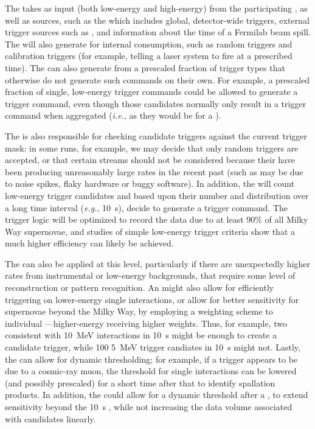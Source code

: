 The  takes as input  (both low-energy
and high-energy) from the participating , as well as
 sources, such as the  which includes
global, detector-wide triggers, external trigger sources such as
, and information about the time of a Fermilab beam
spill. 
The  will also generate  for internal
consumption, such as random triggers and calibration triggers (for
example, telling a laser system to fire at a prescribed time). 
The  can also generate  from a
prescaled fraction of trigger types that otherwise do not generate
such commands on their own. 
For example, a prescaled fraction of single, low-energy trigger
commands could be allowed to generate a trigger command, even though
those candidates normally only result in a trigger command when
aggregated ({\it i.e.}, as they would be for a ).


The  is also responsible for checking candidate triggers
against the current  trigger mask: in some runs, for
example, we may decide that only random triggers are accepted, or that
certain  streams should not be considered
because their  have been producing unreasonably large
rates in the recent past (such as may be due to noise spikes, flaky
hardware or buggy software).
In addition, the  will count low-energy trigger candidates
and based upon their number and distribution over a long time interval
({\it e.g.}, \SI{10}{\s}), decide to generate a  trigger command.
The trigger logic will be optimized to record the data due to at least
90\% of all Milky Way supernovae, and studies of simple low-energy
trigger criteria show that a much higher efficiency can likely be
achieved.

	
The  can also be applied at this level, particularly if
there are unexpectedly higher rates from instrumental or low-energy
backgrounds, that require some level of reconstruction or pattern
recognition. 
An  might also allow for efficiently triggering on
lower-energy single interactions, or allow for better sensitivity for
supernovae beyond the Milky Way, by employing a weighting scheme to
individual ---higher-energy
 receiving higher weights. 
Thus, for example, two  consistent with
\SI{10}{\MeV} interactions in \SI{10}{\s} might be enough to create a
 candidate trigger, while 100 \SI{5}{\MeV} trigger
candiates in \SI{10}{\s} might not.
Lastly, the  can allow for dynamic thresholding; for
example, if a trigger appears to be due to a cosmic-ray muon, the
threshold for single interactions can be lowered (and possibly
prescaled) for a short time after that to identify spallation
products. 
In addition, the  could allow for a dynamic threshold after
a , to extend sensitivity beyond the \SI{10}{\s}
 , while not increasing the data
volume associated with  candidates linearly. 

